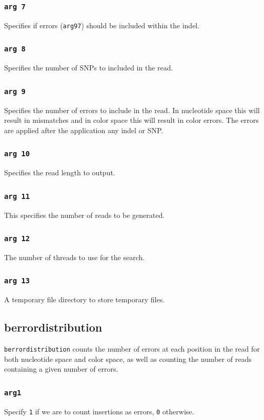 \documentclass[a4paper,12pt]{book}
\newcommand{\TT}[1]{{\tt #1}} %
\begin{document}
\subsubsection{\TT{arg 7}}
Specifies if errors (\TT{arg97}) should be included within the indel. 
\subsubsection{\TT{arg 8}}
Specifies the number of SNPs to included in the read.
\subsubsection{\TT{arg 9}}
Specifies the number of errors to include in the read.
In nucleotide space this will result in mismatches and in color space this will result in color errors.
The errors are applied after the application any indel or SNP.
\subsubsection{\TT{arg 10}}
Specifies the read length to output.
\subsubsection{\TT{arg 11}}
This specifies the number of reads to be generated.
\subsubsection{\TT{arg 12}}
The number of threads to use for the search.
\subsubsection{\TT{arg 13}}
A temporary file directory to store temporary files.


\subsection{berrordistribution}
\label{sec:berrordistribution}
\TT{berrordistribution} counts the number of errors at each position in the read for both nucleotide space and color space, as well as counting the number of reads containing a given number of errors.

\subsubsection{\TT{arg1}}
Specify \TT{1} if we are to count insertions as errors, \TT{0} otherwise.
\end{document}
